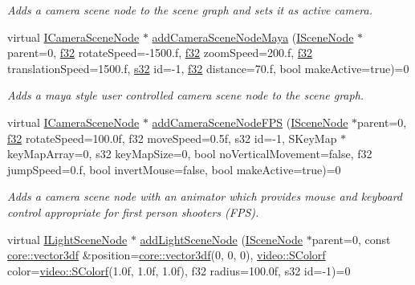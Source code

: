 \begin{DoxyCompactItemize}
\begin{DoxyCompactList}\small\item\em Adds a camera scene node to the scene graph and sets it as active camera. \end{DoxyCompactList}\item 
virtual \hyperlink{classirr_1_1scene_1_1ICameraSceneNode}{I\+Camera\+Scene\+Node} $\ast$ \hyperlink{classirr_1_1scene_1_1ISceneManager_a18e81a59e02231567ac938ea287fe523}{add\+Camera\+Scene\+Node\+Maya} (\hyperlink{classirr_1_1scene_1_1ISceneNode}{I\+Scene\+Node} $\ast$parent=0, \hyperlink{namespaceirr_a0277be98d67dc26ff93b1a6a1d086b07}{f32} rotate\+Speed=-\/1500.f, \hyperlink{namespaceirr_a0277be98d67dc26ff93b1a6a1d086b07}{f32} zoom\+Speed=200.f, \hyperlink{namespaceirr_a0277be98d67dc26ff93b1a6a1d086b07}{f32} translation\+Speed=1500.f, \hyperlink{namespaceirr_ac66849b7a6ed16e30ebede579f9b47c6}{s32} id=-\/1, \hyperlink{namespaceirr_a0277be98d67dc26ff93b1a6a1d086b07}{f32} distance=70.f, bool make\+Active=true)=0
\begin{DoxyCompactList}\small\item\em Adds a maya style user controlled camera scene node to the scene graph. \end{DoxyCompactList}\item 
virtual \hyperlink{classirr_1_1scene_1_1ICameraSceneNode}{I\+Camera\+Scene\+Node} $\ast$ \hyperlink{classirr_1_1scene_1_1ISceneManager_ac312cbc85161678d00192880f2cdddbb}{add\+Camera\+Scene\+Node\+F\+PS} (\hyperlink{classirr_1_1scene_1_1ISceneNode}{I\+Scene\+Node} $\ast$parent=0, \hyperlink{namespaceirr_a0277be98d67dc26ff93b1a6a1d086b07}{f32} rotate\+Speed=100.\+0f, f32 move\+Speed=0.\+5f, s32 id=-\/1, S\+Key\+Map $\ast$key\+Map\+Array=0, s32 key\+Map\+Size=0, bool no\+Vertical\+Movement=false, f32 jump\+Speed=0.\+f, bool invert\+Mouse=false, bool make\+Active=true)=0
\begin{DoxyCompactList}\small\item\em Adds a camera scene node with an animator which provides mouse and keyboard control appropriate for first person shooters (F\+PS). \end{DoxyCompactList}\item 
virtual \hyperlink{classirr_1_1scene_1_1ILightSceneNode}{I\+Light\+Scene\+Node} $\ast$ \hyperlink{classirr_1_1scene_1_1ISceneManager_a2e6442f8c95a544c355bd137ccdb7095}{add\+Light\+Scene\+Node} (\hyperlink{classirr_1_1scene_1_1ISceneNode}{I\+Scene\+Node} $\ast$parent=0, const \hyperlink{namespaceirr_1_1core_a06f169d08b5c429f5575acb7edbad811}{core\+::vector3df} \&position=\hyperlink{namespaceirr_1_1core_a06f169d08b5c429f5575acb7edbad811}{core\+::vector3df}(0, 0, 0), \hyperlink{classirr_1_1video_1_1SColorf}{video\+::\+S\+Colorf} color=\hyperlink{classirr_1_1video_1_1SColorf}{video\+::\+S\+Colorf}(1.\+0f, 1.\+0f, 1.\+0f), f32 radius=100.\+0f, s32 id=-\/1)=0

\end{DoxyCompactItemize}
